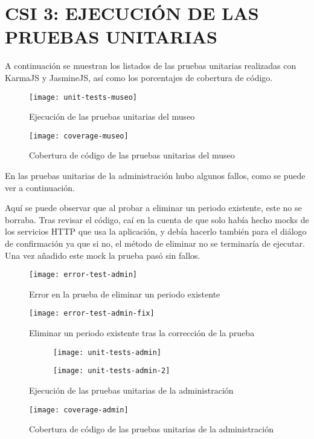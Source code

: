\newpage
\section{CSI 3: EJECUCIÓN DE LAS PRUEBAS UNITARIAS}
A continuación se muestran los listados de las pruebas unitarias realizadas con KarmaJS y JasmineJS, así como los porcentajes de cobertura de código.\par
\begin{figure}[H]
\centering
\texttt{[image: unit-tests-museo]}
\caption{Ejecución de las pruebas unitarias del museo}
\end{figure}
\begin{figure}[H]
\centering
\centerline{\texttt{[image: coverage-museo]}}
\caption{Cobertura de código de las pruebas unitarias del museo}
\end{figure}
En las pruebas unitarias de la administración hubo algunos fallos, como se puede ver a continuación.\par
Aquí se puede observar que al probar a eliminar un periodo existente, este no se borraba. Tras revisar el código, caí en la cuenta de que solo había hecho mocks de los servicios HTTP que usa la aplicación, y debía hacerlo también para el diálogo de confirmación ya que si no, el método de eliminar no se terminaría de ejecutar. Una vez añadido este mock la prueba pasó sin fallos.
\begin{figure}[H]
\centering
\centerline{\texttt{[image: error-test-admin]}}
\caption{Error en la prueba de eliminar un periodo existente}
\end{figure}
\begin{figure}[H]
\centering
\texttt{[image: error-test-admin-fix]}
\caption{Eliminar un periodo existente tras la corrección de la prueba}
\end{figure}
\begin{figure}[H]
\hspace{-10mm}
\begin{subfigure}[b]{0.6\textwidth}
\centering
\texttt{[image: unit-tests-admin]}
\end{subfigure}
\begin{subfigure}[b]{0.4\textwidth}
\centering
\texttt{[image: unit-tests-admin-2]}
\end{subfigure}
\caption{Ejecución de las pruebas unitarias de la administración}
\end{figure}
\begin{figure}[H]
\centering
\centerline{\texttt{[image: coverage-admin]}}
\caption{Cobertura de código de las pruebas unitarias de la administración}
\end{figure}

